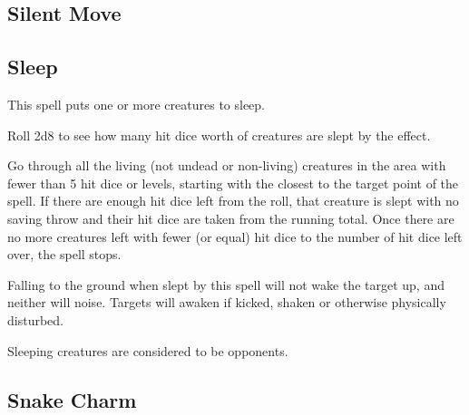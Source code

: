 \begin{multicols*}{2}
\subsection{Silent Move}\label{spell:Silent Move}



\subsection{Sleep}\label{spell:Sleep}

This spell puts one or more creatures to sleep.

Roll 2d8 to see how many hit dice worth of creatures are slept by the effect.

Go through all the living (not undead or non-living) creatures in the area with fewer than 5 hit dice or levels, starting with the closest to the target point of the spell. If there are enough hit dice left from the roll, that creature is slept with no saving throw and their hit dice are taken from the running total. Once there are no more creatures left with fewer (or equal) hit dice to the number of hit dice left over, the spell stops.

Falling to the ground when slept by this spell will not wake the target up, and neither will noise. Targets will awaken if kicked, shaken or otherwise physically disturbed.

Sleeping creatures are considered to be  opponents.

\subsection{Snake Charm}\label{spell:Snake Charm}


\end{multicols*}

